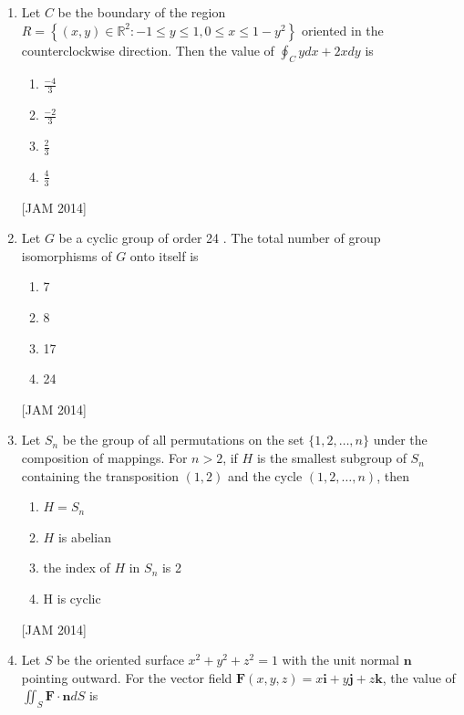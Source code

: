 \begin{enumerate}
\begin{enumerate}
\end{enumerate}
\hfill [JAM 2014]


\item  Let $C$ be the boundary of the region $R=\left\{(x, y) \in \mathbb{R}^{2}:-1 \leq y \leq 1,0 \leq x \leq 1-y^{2}\right\}$ oriented in the counterclockwise direction. Then the value of $\oint_{C} y d x+2 x d y$ is 

\begin{enumerate}
 \item $\frac{-4}{3}$ 
\item $\frac{-2}{3}$ 
\item $\frac{2}{3}$ 
\item $\frac{4}{3}$
\end{enumerate}
\hfill [JAM 2014]



\item  Let $G$ be a cyclic group of order 24 . The total number of group isomorphisms of $G$ onto itself is 

\begin{enumerate}
 \item 7 
\item 8 
\item 17 
\item 24
\end{enumerate}
\hfill [JAM 2014]



\item  Let $S_{n}$ be the group of all permutations on the set $\{1,2, \ldots, n\}$ under the composition of mappings. For $n>2$, if $H$ is the smallest subgroup of $S_{n}$ containing the transposition $(1,2)$ and the cycle $(1,2, \ldots, n)$, then 

\begin{enumerate}
 
\item $H=S_{n}$ 
\item $H$ is abelian 
\item the index of $H$ in $S_{n}$ is 2 
\item $\mathrm{H}$ is cyclic
\end{enumerate}
\hfill [JAM 2014]


\item  Let $S$ be the oriented surface $x^{2}+y^{2}+z^{2}=1$ with the unit normal $\mathbf{n}$ pointing outward. For the vector field $\mathbf{F}(x, y, z)=x \mathbf{i}+y \mathbf{j}+z \mathbf{k}$, the value of $\iint_{S} \mathbf{F} \cdot \mathbf{n} d S$ is 


\end{enumerate}
